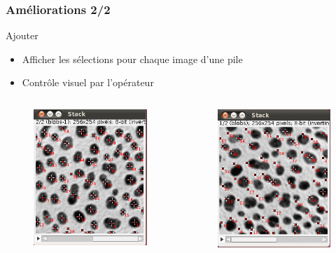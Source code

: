 \documentclass[11pt]{beamer}
\begin{document}
\begin{frame}
\frametitle{Améliorations 2/2}
	
		\begin{block}{Ajouter }
		
		\begin{itemize}
			\item Afficher les sélections pour chaque image d'une pile
			\item Contrôle visuel par l'opérateur
		\end{itemize}
		\end{block}
		\begin{columns}
			\begin{column}{5cm}
				\begin{figure}
					\includegraphics[scale=0.45]{BlobsOK.png}
				\end{figure}
			\end{column}
			\begin{column}{5cm}
				\begin{figure}
					\includegraphics[scale=0.45]{BlobsPasOK-1.png}
				\end{figure}
			\end{column}
		\end{columns}
\end{frame}
\end{document}
